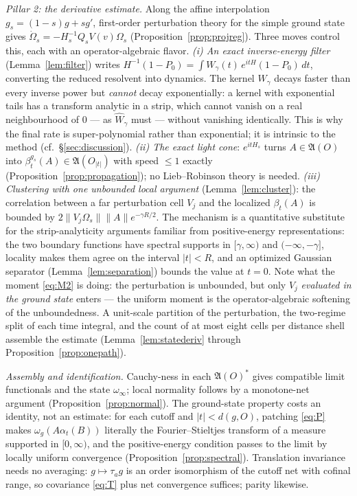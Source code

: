 \documentclass[11pt,a4paper]{article}
\theoremstyle{plain}
\theoremstyle{definition}
\theoremstyle{plain}
\theoremstyle{definition}
\newcommand{\A}{\mathfrak{A}}
\newcommand{\Om}{\Omega}
\begin{document}
\emph{Pillar 2: the derivative estimate.} Along the affine interpolation
$g_s=(1-s)g+sg'$, first-order perturbation theory for the simple ground state gives
$\dot\Om_s=-H_s^{-1}Q_sV(v)\Om_s$ (Proposition~\ref{prop:projreg}). Three moves control
this, each with an operator-algebraic flavor. \emph{(i) An exact inverse-energy filter}
(Lemma~\ref{lem:filter}) writes $H^{-1}(1-P_0)=\int W_\gamma(t)\,e^{itH}(1-P_0)\,dt$,
converting the reduced resolvent into dynamics. The kernel $W_\gamma$ decays faster than
every inverse power but \emph{cannot} decay exponentially: a kernel with exponential
tails has a transform analytic in a strip, which cannot vanish on a real neighbourhood of
$0$ --- as $\widehat W_\gamma$ must --- without vanishing identically. This is why the
final rate is super-polynomial rather than exponential; it is intrinsic to the method
(cf.\ \S\ref{sec:discussion}). \emph{(ii) The exact light cone}: $e^{itH_s}$ turns
$A\in\A(O)$ into $\beta^{g_s}_t(A)\in\A(O_{|t|})$ with speed $\le1$ exactly
(Proposition~\ref{prop:propagation}); no Lieb--Robinson theory is needed. \emph{(iii)
Clustering with one unbounded local argument} (Lemma~\ref{lem:cluster}): the correlation
between a far perturbation cell $V_j$ and the localized $\beta_t(A)$ is bounded by
$2\|V_j\Om_s\|\|A\|e^{-\gamma R/2}$. The mechanism is a quantitative substitute for the
strip-analyticity arguments familiar from positive-energy representations: the two
boundary functions have spectral supports in $[\gamma,\infty)$ and $(-\infty,-\gamma]$,
locality makes them agree on the interval $|t|<R$, and an optimized Gaussian separator
(Lemma~\ref{lem:separation}) bounds the value at $t=0$. Note what the moment
\eqref{eq:M2} is doing: the perturbation is unbounded, but only $V_j$ \emph{evaluated in
the ground state} enters --- the uniform moment is the operator-algebraic softening of
the unboundedness. A unit-scale partition of the perturbation, the two-regime split of
each time integral, and the count of at most eight cells per distance shell assemble the
estimate (Lemma~\ref{lem:statederiv} through Proposition~\ref{prop:onepath}).

\emph{Assembly and identification.} Cauchy-ness in each $\A(O)^*$ gives compatible limit
functionals and the state $\omega_\infty$; local normality follows by a monotone-net
argument (Proposition~\ref{prop:normal}). The ground-state property costs an identity,
not an estimate: for each cutoff and $|t|<d(g,O)$, patching \eqref{eq:P} makes
$\omega_g(A\alpha_t(B))$ literally the Fourier--Stieltjes transform of a measure
supported in $[0,\infty)$, and the positive-energy condition passes to the limit by
locally uniform convergence (Proposition~\ref{prop:spectral}). Translation invariance
needs no averaging: $g\mapsto\tau_ag$ is an order isomorphism of the cutoff net with
cofinal range, so covariance \eqref{eq:T} plus net convergence suffices; parity likewise.
\end{document}

